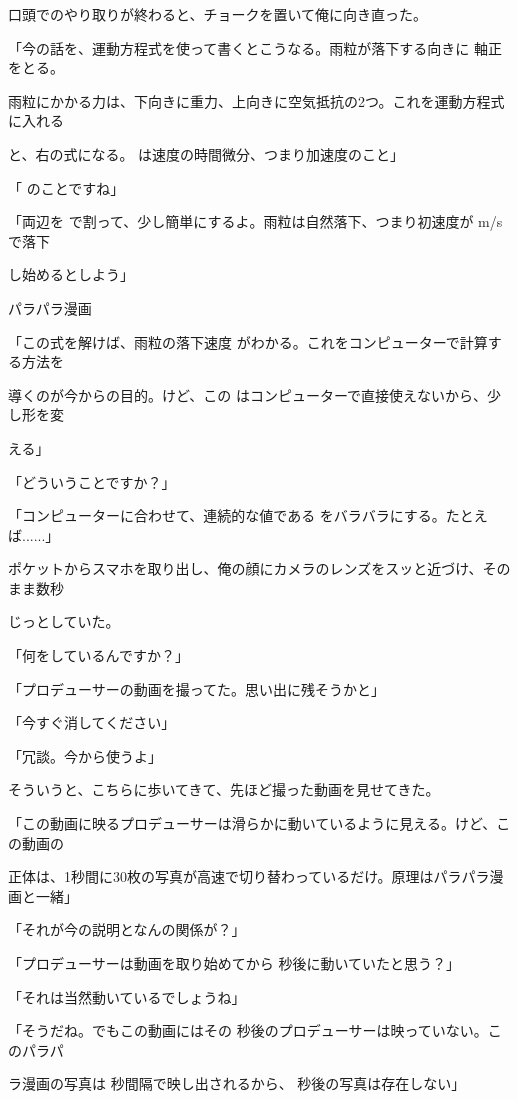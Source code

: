 ⼝頭でのやり取りが終わると、チョークを置いて俺に向き直った。\par
「今の話を、運動⽅程式を使って書くとこうなる。⾬粒が落下する向きに 軸正をとる。\par
⾬粒にかかる⼒は、下向きに重⼒、上向きに空気抵抗の2つ。これを運動⽅程式に⼊れる\par
と、右の式になる。 は速度の時間微分、つまり加速度のこと」\par
「 のことですね」\par
「両辺を で割って、少し簡単にするよ。⾬粒は⾃然落下、つまり初速度が  m/sで落下\par
し始めるとしよう」\par
パラパラ漫画\par
「この式を解けば、⾬粒の落下速度 がわかる。これをコンピューターで計算する⽅法を\par
導くのが今からの⽬的。けど、この はコンピューターで直接使えないから、少し形を変\par
える」\par
「どういうことですか？」\par
「コンピューターに合わせて、連続的な値である をバラバラにする。たとえば......」\par
ポケットからスマホを取り出し、俺の顔にカメラのレンズをスッと近づけ、そのまま数秒\par
じっとしていた。\par
「何をしているんですか？」\par
「プロデューサーの動画を撮ってた。思い出に残そうかと」\par
「今すぐ消してください」\par
「冗談。今から使うよ」\par
そういうと、こちらに歩いてきて、先ほど撮った動画を⾒せてきた。\par
「この動画に映るプロデューサーは滑らかに動いているように⾒える。けど、この動画の\par
正体は、1秒間に30枚の写真が⾼速で切り替わっているだけ。原理はパラパラ漫画と⼀緒」\par
「それが今の説明となんの関係が？」\par
「プロデューサーは動画を取り始めてから 秒後に動いていたと思う？」\par
「それは当然動いているでしょうね」\par
「そうだね。でもこの動画にはその 秒後のプロデューサーは映っていない。このパラパ\par
ラ漫画の写真は 秒間隔で映し出されるから、 秒後の写真は存在しない」\par
